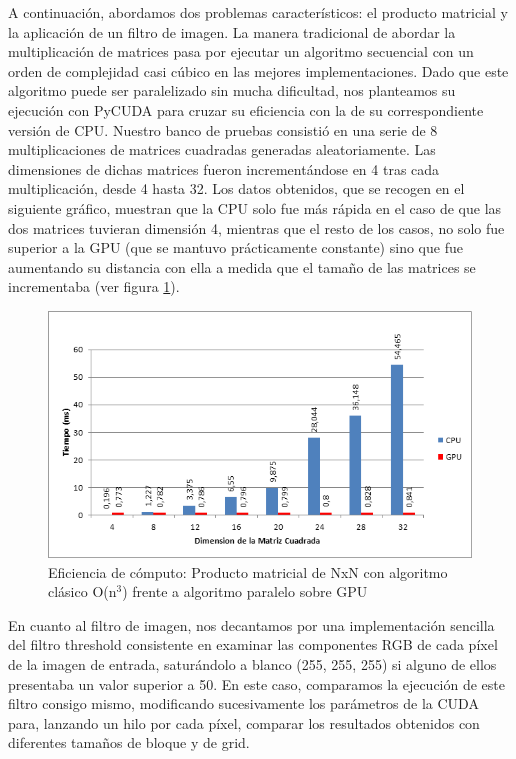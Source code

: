 \documentclass[twoside]{article}
\begin{document}
\vspace{5 mm}

A continuación, abordamos dos problemas característicos: el producto matricial y la aplicación de un filtro de imagen. La manera tradicional de abordar la multiplicación de matrices pasa por ejecutar un algoritmo secuencial con un orden de complejidad casi cúbico en las mejores implementaciones. Dado que este algoritmo puede ser paralelizado sin mucha dificultad, nos planteamos su ejecución con PyCUDA para cruzar su eficiencia con la de su correspondiente versión de CPU. Nuestro banco de pruebas consistió en una serie de 8 multiplicaciones de matrices cuadradas generadas aleatoriamente. Las dimensiones de dichas matrices fueron incrementándose en 4 tras cada multiplicación, desde 4 hasta 32. Los datos obtenidos, que se recogen en el siguiente gráfico, muestran que la CPU solo fue más rápida en el caso de que las dos matrices tuvieran dimensión 4, mientras que el resto de los casos, no solo fue superior a la GPU (que se mantuvo prácticamente constante) sino que fue aumentando su distancia con ella a medida que el tamaño de las matrices se incrementaba (ver figura \ref{fig:cpu-gpu}).

\begin{figure}
   \begin{center}
      \includegraphics[width=.9\textwidth]{cpu-gpu.png}
      \caption{\label{fig:cpu-gpu}Eficiencia de cómputo: Producto matricial de NxN con algoritmo clásico O(n$^{3}$) frente a algoritmo paralelo sobre GPU}
   \end{center}
\end{figure}

En cuanto al filtro de imagen, nos decantamos por una implementación sencilla del filtro threshold consistente en examinar las componentes RGB de cada píxel de la imagen de entrada, saturándolo a blanco (255, 255, 255) si alguno de ellos presentaba un valor superior a 50. En este caso, comparamos la ejecución de este filtro consigo mismo, modificando sucesivamente los parámetros de la CUDA para, lanzando un hilo por cada píxel, comparar los resultados obtenidos con diferentes tamaños de bloque y de grid.
\end{document}
